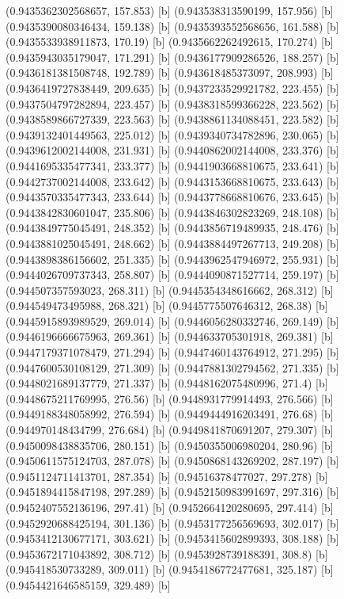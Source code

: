 {{{(0.9435362302568657, 157.853) [b] 
(0.943538313590199, 157.956) [b] 
(0.9435390080346434, 159.138) [b] 
(0.9435393552568656, 161.588) [b] 
(0.9435533938911873, 170.19) [b] 
(0.9435662262492615, 170.274) [b] 
(0.9435943035179047, 171.291) [b] 
(0.9436177909286526, 188.257) [b] 
(0.9436181381508748, 192.789) [b] 
(0.943618485373097, 208.993) [b] 
(0.9436419727838449, 209.635) [b] 
(0.9437233529921782, 223.455) [b] 
(0.9437504797282894, 223.457) [b] 
(0.9438318599366228, 223.562) [b] 
(0.9438589866727339, 223.563) [b] 
(0.9438861134088451, 223.582) [b] 
(0.9439132401449563, 225.012) [b] 
(0.9439340734782896, 230.065) [b] 
(0.9439612002144008, 231.931) [b] 
(0.9440862002144008, 233.376) [b] 
(0.9441695335477341, 233.377) [b] 
(0.9441903668810675, 233.641) [b] 
(0.9442737002144008, 233.642) [b] 
(0.9443153668810675, 233.643) [b] 
(0.9443570335477343, 233.644) [b] 
(0.9443778668810676, 233.645) [b] 
(0.9443842830601047, 235.806) [b] 
(0.9443846302823269, 248.108) [b] 
(0.9443849775045491, 248.352) [b] 
(0.9443856719489935, 248.476) [b] 
(0.9443881025045491, 248.662) [b] 
(0.9443884497267713, 249.208) [b] 
(0.9443898386156602, 251.335) [b] 
(0.9443962547946972, 255.931) [b] 
(0.9444026709737343, 258.807) [b] 
(0.9444090871527714, 259.197) [b] 
(0.944507357593023, 268.311) [b] 
(0.9445354348616662, 268.312) [b] 
(0.944549473495988, 268.321) [b] 
(0.9445775507646312, 268.38) [b] 
(0.9445915893989529, 269.014) [b] 
(0.9446056280332746, 269.149) [b] 
(0.9446196666675963, 269.361) [b] 
(0.944633705301918, 269.381) [b] 
(0.9447179371078479, 271.294) [b] 
(0.9447460143764912, 271.295) [b] 
(0.9447600530108129, 271.309) [b] 
(0.9447881302794562, 271.335) [b] 
(0.9448021689137779, 271.337) [b] 
(0.9448162075480996, 271.4) [b] 
(0.9448675211769995, 276.56) [b] 
(0.9448931779914493, 276.566) [b] 
(0.9449188348058992, 276.594) [b] 
(0.9449444916203491, 276.68) [b] 
(0.944970148434799, 276.684) [b] 
(0.9449841870691207, 279.307) [b] 
(0.9450098438835706, 280.151) [b] 
(0.9450355006980204, 280.96) [b] 
(0.9450611575124703, 287.078) [b] 
(0.9450868143269202, 287.197) [b] 
(0.9451124711413701, 287.354) [b] 
(0.94516378477027, 297.278) [b] 
(0.9451894415847198, 297.289) [b] 
(0.9452150983991697, 297.316) [b] 
(0.9452407552136196, 297.41) [b] 
(0.9452664120280695, 297.414) [b] 
(0.9452920688425194, 301.136) [b] 
(0.9453177256569693, 302.017) [b] 
(0.9453412130677171, 303.621) [b] 
(0.9453415602899393, 308.188) [b] 
(0.9453672171043892, 308.712) [b] 
(0.9453928739188391, 308.8) [b] 
(0.945418530733289, 309.011) [b] 
(0.9454186772477681, 325.187) [b] 
(0.9454421646585159, 329.489) [b] 
}}}
